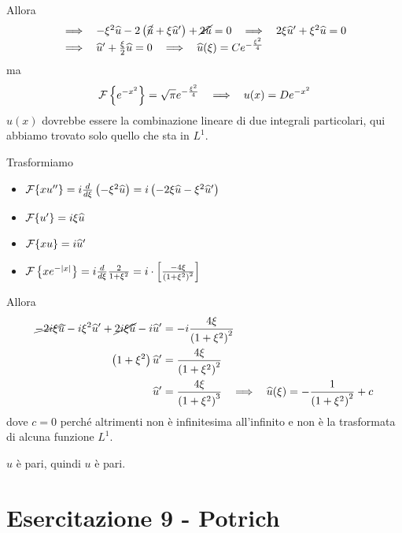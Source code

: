 Allora
\begin{equation*}
\begin{array}{ l }
\implies \ \ - \xi ^{2}\hat{u} - 2\left(\cancel{\hat{u}} + \xi \hat{u} '\right) + \cancel{2\hat{u}} = 0\ \ \implies \ \ 2\xi \hat{u} ' + \xi ^{2}\hat{u} = 0\\
\implies \ \ \hat{u} ' + \frac{\xi }{2}\hat{u} = 0\ \ \implies \ \ \hat{u}(\xi) = Ce^{ - \frac{\xi ^{2}}{4}}
\end{array}
\end{equation*}
ma
\begin{equation*}
\Fc \left\{e^{ - x^{2}}\right\} = \sqrt{\pi } e^{ - \frac{\xi ^{2}}{4}} \ \ \implies \ \ u(x) = De^{ - x^{2}}
\end{equation*}
$u(x)$ dovrebbe essere la combinazione lineare di due integrali particolari, qui abbiamo trovato solo quello che sta in $L^{1}$.
\Soluzione

Trasformiamo
\begin{itemize}
\item $\mathcal{F} \{xu''\} = i\frac{d}{d\xi }\left(- \xi ^{2}\widehat{u}\right) = i\left(- 2\xi \widehat{u} - \xi ^{2}\widehat{u} '\right)$
\item $\mathcal{F} \{u'\} = i\xi \widehat{u}$
\item $\mathcal{F} \{xu\} = i\widehat{u} '$
\item $\mathcal{F} \left\{xe^{ - | x| }\right\} = i\frac{d}{d\xi }\frac{2}{1 + \xi ^{2}} = i\cdot \left[\frac{ - 4\xi }{\left(1 + \xi ^{2}\right)^{2}}\right]$
\end{itemize}

Allora
\begin{equation*}
\begin{aligned}
\cancel{ - 2i\xi \hat{u}} - i\xi ^{2}\hat{u} ' + \cancel{2i\xi \hat{u}} - i\hat{u} ' & = - i\frac{4\xi }{\left(1 + \xi ^{2}\right)^{2}}\\
\left(1 + \xi ^{2}\right)\hat{u} ' & = \frac{4\xi }{\left(1 + \xi ^{2}\right)^{2}}\\
\hat{u} ' & = \frac{4\xi }{\left(1 + \xi ^{2}\right)^{3}} \ \ \implies \ \ \hat{u}(\xi) = - \frac{1}{\left(1 + \xi ^{2}\right)^{2}} + c
\end{aligned}
\end{equation*}
dove $c = 0$ perché altrimenti non è infinitesima all'infinito e non è la trasformata di alcuna funzione $L^{1}$.

$\hat{u}$ è pari, quindi $u$ è pari.
\chapter{Esercitazione 9 - Potrich}
\ParteEsercizi
\Esercizio{}

